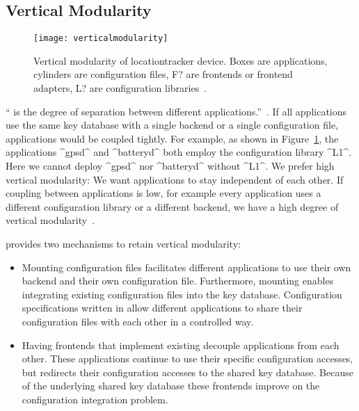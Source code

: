 \subsection{Vertical Modularity}
\label{sec:backend-vertical-modularity}

\begin{figure}[htp]
\centering
\texttt{[image: verticalmodularity]}
\caption[Vertical modularity.]{Vertical modularity of locationtracker device. \textnormal{Boxes are applications, cylinders are configuration files, F? are frontends or frontend adapters, L? are configuration libraries~\cite{raab2016improving}.}}
\label{fig:verticalmodularity}
\end{figure}


`` is the degree of separation between different applications.''~\cite{raab2016improving}.
If all applications use the same key database with a single backend or a single configuration file, applications would be coupled tightly.
For example, as shown in Figure~\ref{fig:verticalmodularity}, the applications ^gpsd^ and ^batteryd^ both employ the configuration library ^L1^.
Here we cannot deploy ^gpsd^ nor ^batteryd^ without ^L1^.
We prefer high vertical modularity:
We want applications to stay independent of each other.
If coupling between applications is low, for example every application uses a different configuration library or a different backend, we have a high degree of vertical modularity~\cite{raab2016improving}.

\elektra{} provides two mechanisms to retain vertical modularity:

\begin{itemize}
\item Mounting configuration files facilitates different applications to use their own backend and their own configuration file.
Furthermore, mounting enables integrating existing configuration files into the key database.
Configuration specifications written in  allow different applications to share their configuration files with each other in a controlled way.

\item Having frontends that implement existing  decouple applications from each other.
These applications continue to use their specific configuration accesses, but \elektra{} redirects their configuration accesses to the shared key database.
Because of the underlying shared key database these frontends improve on the configuration integration problem.
\end{itemize}



